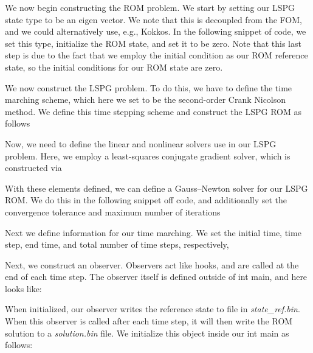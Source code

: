 We now begin constructing the R\+OM problem. We start by setting our L\+S\+PG state type to be an eigen vector. We note that this is decoupled from the F\+OM, and we could alternatively use, e.\+g., Kokkos. In the following snippet of code, we set this type, initialize the R\+OM state, and set it to be zero. Note that this last step is due to the fact that we employ the initial condition as our R\+OM reference state, so the initial conditions for our R\+OM state are zero. 
\begin{DoxyCode}{0}
\end{DoxyCode}


We now construct the L\+S\+PG problem. To do this, we have to define the time marching scheme, which here we set to be the second-\/order Crank Nicolson method. We define this time stepping scheme and construct the L\+S\+PG R\+OM as follows 
\begin{DoxyCode}{0}
\end{DoxyCode}


Now, we need to define the linear and nonlinear solvers use in our L\+S\+PG problem. Here, we employ a least-\/squares conjugate gradient solver, which is constructed via 
\begin{DoxyCode}{0}
\end{DoxyCode}


With these elements defined, we can define a Gauss--Newton solver for our L\+S\+PG R\+OM. We do this in the following snippet off code, and additionally set the convergence tolerance and maximum number of iterations 
\begin{DoxyCode}{0}
\end{DoxyCode}


Next we define information for our time marching. We set the initial time, time step, end time, and total number of time steps, respectively, 
\begin{DoxyCode}{0}
\end{DoxyCode}


Next, we construct an observer. Observers act like hooks, and are called at the end of each time step. The observer itself is defined outside of int main, and here looks like\+: 
\begin{DoxyCode}{0}
\end{DoxyCode}


When initialized, our observer writes the reference state to file in {\itshape state\+\_\+ref.\+bin}. When this observer is called after each time step, it will then write the R\+OM solution to a {\itshape solution.\+bin} file. We initialize this object inside our int main as follows\+:


